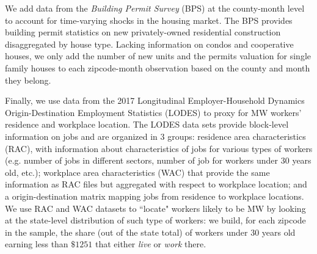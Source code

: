 We add data from the \textit{Building Permit Survey} (BPS) at the county-month level to account for 
time-varying shocks in the housing market. The BPS provides building permit statistics on new 
privately-owned residential construction disaggregated by house type. Lacking information on condos 
and cooperative houses, we only add the number of new units and the permits valuation for single 
family houses to each zipcode-month observation based on the county and month they belong.

Finally, we use data from the 2017 Longitudinal Employer-Household Dynamics Origin-Destination 
Employment Statistics (LODES) to proxy for MW workers' residence and workplace location. The LODES 
data sets provide block-level information on jobs and are organized in 3 groups: residence area 
characteristics (RAC), with information about characteristics of jobs for various types of workers 
(e.g. number of jobs in different sectors, number of job for workers under 30 years old, etc.); 
workplace area characteristics (WAC) that provide the same information as RAC files but aggregated 
with respect to workplace location; and a origin-destination matrix mapping jobs from residence to 
workplace locations. We use RAC and WAC datasets to ``locate" workers likely to be MW by looking at 
the state-level distribution of such type of workers: we build, for each zipcode in the sample, the 
share (out of the state total) of workers under 30 years old earning less than $\$1251$ that either 
\textit{live} or \textit{work} there. 
